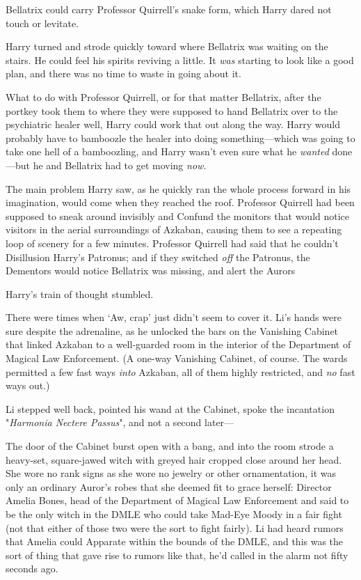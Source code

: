 Bellatrix could carry Professor Quirrell's snake form, which Harry dared not
touch or levitate.

Harry turned and strode quickly toward where Bellatrix was waiting on the
stairs. He could feel his spirits reviving a little. It \emph{was} starting to
look like a good plan, and there was no time to waste in going about it.

What to do with Professor Quirrell, or for that matter Bellatrix, after the
portkey took them to where they were supposed to hand Bellatrix over to the
psychiatric healer{\el} well, Harry could work that out along the way. Harry
would probably have to bamboozle the healer into doing something—which was
going to take one hell of a bamboozling, and Harry wasn't even sure what he
\emph{wanted} done—but he and Bellatrix had to get moving \emph{now.}

The main problem Harry saw, as he quickly ran the whole process forward in his
imagination, would come when they reached the roof. Professor Quirrell had been
supposed to sneak around invisibly and Confund the monitors that would notice
visitors in the aerial surroundings of Azkaban, causing them to see a repeating
loop of scenery for a few minutes. Professor Quirrell had said that he couldn't
Disillusion Harry's Patronus; and if they switched \emph{off} the Patronus, the
Dementors would notice Bellatrix was missing, and alert the Aurors{\el}

Harry's train of thought stumbled.

There were times when `Aw, crap' just didn't seem to cover it.
\sbreak
Li's hands were sure despite the adrenaline, as he unlocked the bars on the
Vanishing Cabinet that linked Azkaban to a well-guarded room in the interior of
the Department of Magical Law Enforcement. (A one-way Vanishing Cabinet, of
course. The wards permitted a few fast ways \emph{into} Azkaban, all of them
highly restricted, and \emph{no} fast ways out.)

Li stepped well back, pointed his wand at the Cabinet, spoke the incantation
"\emph{Harmonia Nectere Passus}", and not a second later—

The door of the Cabinet burst open with a bang, and into the room strode a
heavy-set, square-jawed witch with greyed hair cropped close around her head.
She wore no rank signs as she wore no jewelry or other ornamentation, it was
only an ordinary Auror's robes that she deemed fit to grace herself: Director
Amelia Bones, head of the Department of Magical Law Enforcement and said to be
the only witch in the DMLE who could take Mad-Eye Moody in a fair fight (not
that either of those two were the sort to fight fairly). Li had heard rumors
that Amelia could Apparate within the bounds of the DMLE, and this was the sort
of thing that gave rise to rumors like that, he'd called in the alarm not fifty
seconds ago.

